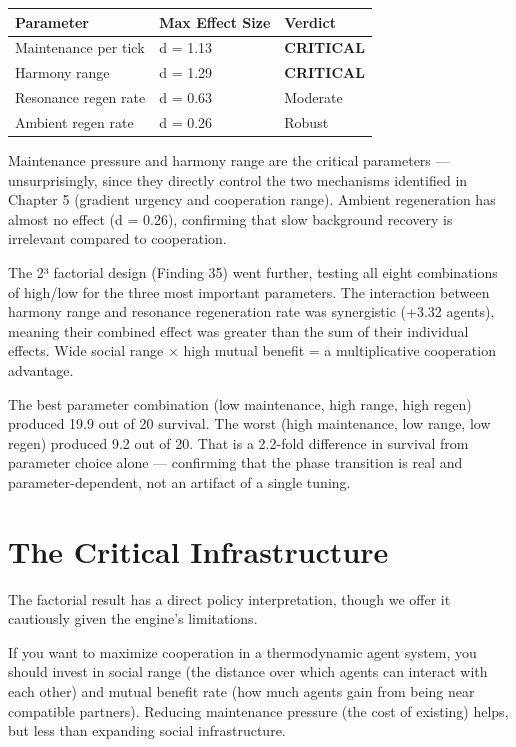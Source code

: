 \begin{longtable}[]{@{}lll@{}}
\toprule\noalign{}
Parameter & Max Effect Size & Verdict \\
\midrule\noalign{}
\endhead
\bottomrule\noalign{}
\endlastfoot
Maintenance per tick & d = 1.13 & \textbf{CRITICAL} \\
Harmony range & d = 1.29 & \textbf{CRITICAL} \\
Resonance regen rate & d = 0.63 & Moderate \\
Ambient regen rate & d = 0.26 & Robust \\
\end{longtable}

Maintenance pressure and harmony range are the critical parameters --- unsurprisingly, since they directly control the two mechanisms identified in Chapter 5 (gradient urgency and cooperation range). Ambient regeneration has almost no effect (d = 0.26), confirming that slow background recovery is irrelevant compared to cooperation.

The 2³ factorial design (Finding 35) went further, testing all eight combinations of high/low for the three most important parameters. The interaction between harmony range and resonance regeneration rate was synergistic (+3.32 agents), meaning their combined effect was greater than the sum of their individual effects. Wide social range $\times$ high mutual benefit = a multiplicative cooperation advantage.

The best parameter combination (low maintenance, high range, high regen) produced 19.9 out of 20 survival. The worst (high maintenance, low range, low regen) produced 9.2 out of 20. That is a 2.2-fold difference in survival from parameter choice alone --- confirming that the phase transition is real and parameter-dependent, not an artifact of a single tuning.

\section{The Critical Infrastructure}\label{the-critical-infrastructure}

The factorial result has a direct policy interpretation, though we offer it cautiously given the engine's limitations.

If you want to maximize cooperation in a thermodynamic agent system, you should invest in social range (the distance over which agents can interact with each other) and mutual benefit rate (how much agents gain from being near compatible partners). Reducing maintenance pressure (the cost of existing) helps, but less than expanding social infrastructure.

